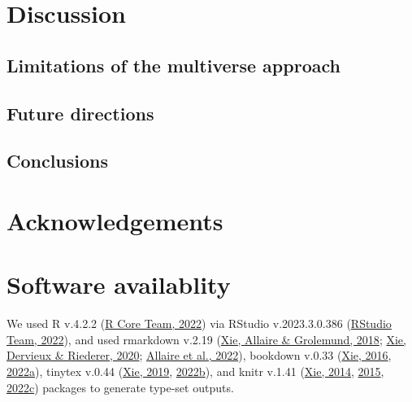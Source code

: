 \documentclass[10pt,a4paper]{article}
\begin{document}
\hypertarget{discussion}{%
\section{Discussion}\label{discussion}}

\hypertarget{limitations-of-the-multiverse-approach}{%
\subsection{Limitations of the multiverse approach}\label{limitations-of-the-multiverse-approach}}

\hypertarget{future-directions}{%
\subsection{Future directions}\label{future-directions}}

\hypertarget{conclusions}{%
\subsection{Conclusions}\label{conclusions}}

\hypertarget{acknowledgements}{%
\section{Acknowledgements}\label{acknowledgements}}

\hypertarget{software-availablity}{%
\section{Software availablity}\label{software-availablity}}

We used R v.4.2.2 (\protect\hyperlink{ref-base}{R Core Team, 2022}) via RStudio v.2023.3.0.386 (\protect\hyperlink{ref-rstudio}{RStudio Team, 2022}), and used rmarkdown v.2.19 (\protect\hyperlink{ref-rmarkdown2018}{Xie, Allaire \& Grolemund, 2018}; \protect\hyperlink{ref-rmarkdown2020}{Xie, Dervieux \& Riederer, 2020}; \protect\hyperlink{ref-rmarkdown2022}{Allaire et al., 2022}), bookdown v.0.33 (\protect\hyperlink{ref-bookdown2016}{Xie, 2016}, \protect\hyperlink{ref-R-bookdown}{2022a}), tinytex v.0.44 (\protect\hyperlink{ref-tinytex2019}{Xie, 2019}, \protect\hyperlink{ref-tinytex2022}{2022b}), and knitr v.1.41 (\protect\hyperlink{ref-knitr2014}{Xie, 2014}, \protect\hyperlink{ref-knitr2015}{2015}, \protect\hyperlink{ref-knitr2022}{2022c}) packages to generate type-set outputs.
\end{document}
